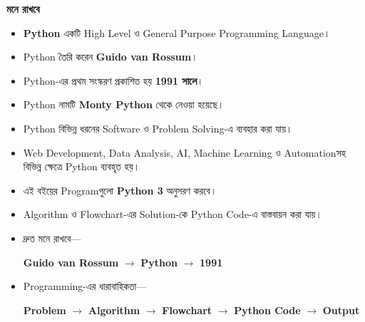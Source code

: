 \begin{rememberbox}

\textbf{\color{deepOrange}মনে রাখবে}

\begin{itemize}

\item
\textbf{Python} একটি High Level ও
General Purpose Programming Language।

\item
Python তৈরি করেন
\textbf{Guido van Rossum}।

\item
Python-এর প্রথম সংস্করণ প্রকাশিত হয়
\textbf{1991 সালে}।

\item
Python নামটি
\textbf{Monty Python}
থেকে নেওয়া হয়েছে।

\item
Python বিভিন্ন ধরনের Software ও Problem Solving-এ
ব্যবহার করা যায়।

\item
Web Development, Data Analysis, AI,
Machine Learning ও Automationসহ বিভিন্ন ক্ষেত্রে
Python ব্যবহৃত হয়।

\item
এই বইয়ের Programগুলো
\textbf{Python 3}
অনুসরণ করবে।

\item
Algorithm ও Flowchart-এর Solution-কে
Python Code-এ বাস্তবায়ন করা যায়।

\item
দ্রুত মনে রাখবে—

\begin{center}

\textbf{Guido van Rossum}
\(\longrightarrow\)
\textbf{Python}
\(\longrightarrow\)
\textbf{1991}

\end{center}

\item
Programming-এর ধারাবাহিকতা—

\begin{center}

\textbf{Problem}
\(\longrightarrow\)
\textbf{Algorithm}
\(\longrightarrow\)
\textbf{Flowchart}
\(\longrightarrow\)
\textbf{Python Code}
\(\longrightarrow\)
\textbf{Output}

\end{center}

\end{itemize}

\end{rememberbox}

\small


